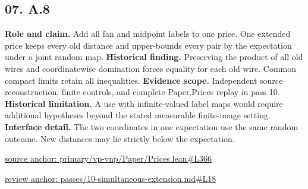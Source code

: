 \documentclass[11pt,letterpaper]{article}
\theoremstyle{definition}\newtheorem{definition}[theorem]{Definition}\newtheorem{example}[theorem]{Example}
\theoremstyle{remark}\newtheorem{remark}[theorem]{Remark}
\begin{document}
\subsection*{07. A.8}
\textbf{Role and claim.} Add all fan and midpoint labels to one price. One extended price keeps every old distance and upper-bounds every pair by the expectation under a joint random map.
\textbf{Historical finding.} Preserving the product of all old wires and coordinatewise domination forces equality for each old wire. Common compact limits retain all inequalities.
\textbf{Evidence scope.} Independent source reconstruction, finite controls, and complete Paper.Prices replay in pass 10.
\textbf{Historical limitation.} A use with infinite-valued label maps would require additional hypotheses beyond the stated measurable finite-image setting.
\textbf{Interface detail.} The two coordinates in one expectation use the same random outcome. New distances may lie strictly below the expectation.
\par\href{https://github.com/nousentllc/VP-VNP-Review/blob/8a7976933b6b2b4ffda1ad3a0dfb5fc6b6f023e8/primary/vp-vnp/Paper/Prices.lean\#L366}{source anchor: primary/vp-vnp/Paper/Prices.lean\#L366}
\par\href{https://github.com/nousentllc/VP-VNP-Review/blob/8a7976933b6b2b4ffda1ad3a0dfb5fc6b6f023e8/passes/10-simultaneous-extension.md\#L18}{review anchor: passes/10-simultaneous-extension.md\#L18}
\goodbreak
{}
\hypertarget{claim.08}{}
\end{document}
